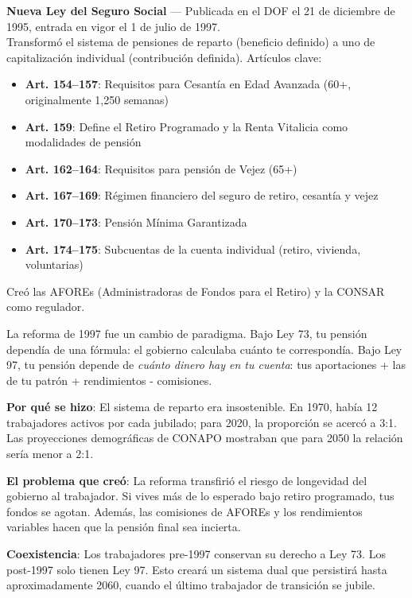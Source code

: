 \documentclass[11pt,a4paper]{report}
\begin{document}
\begin{tcolorbox}[colback=blue!5!white, colframe=blue!75!black, title=\textbf{Definici\'on Formal}]
\textbf{Nueva Ley del Seguro Social} --- Publicada en el DOF el 21 de diciembre de 1995, entrada en vigor el 1 de julio de 1997.\\[0.3em]
Transform\'o el sistema de pensiones de reparto (beneficio definido) a uno de capitalizaci\'on individual (contribuci\'on definida). Art\'iculos clave:
\begin{itemize}[nosep]
\item \textbf{Art. 154--157}: Requisitos para Cesant\'ia en Edad Avanzada (60+, originalmente 1,250 semanas)
\item \textbf{Art. 159}: Define el Retiro Programado y la Renta Vitalicia como modalidades de pensi\'on
\item \textbf{Art. 162--164}: Requisitos para pensi\'on de Vejez (65+)
\item \textbf{Art. 167--169}: R\'egimen financiero del seguro de retiro, cesant\'ia y vejez
\item \textbf{Art. 170--173}: Pensi\'on M\'inima Garantizada
\item \textbf{Art. 174--175}: Subcuentas de la cuenta individual (retiro, vivienda, voluntarias)
\end{itemize}
Cre\'o las AFOREs (Administradoras de Fondos para el Retiro) y la CONSAR como regulador.
\end{tcolorbox}

\begin{tcolorbox}[colback=green!5!white, colframe=green!50!black, title=\textbf{Intuici\'on}]
La reforma de 1997 fue un cambio de paradigma. Bajo Ley 73, tu pensi\'on depend\'ia de una f\'ormula: el gobierno calculaba cu\'anto te correspond\'ia. Bajo Ley 97, tu pensi\'on depende de \emph{cu\'anto dinero hay en tu cuenta}: tus aportaciones + las de tu patr\'on + rendimientos - comisiones.

\textbf{Por qu\'e se hizo}: El sistema de reparto era insostenible. En 1970, hab\'ia 12 trabajadores activos por cada jubilado; para 2020, la proporci\'on se acerc\'o a 3:1. Las proyecciones demogr\'aficas de CONAPO mostraban que para 2050 la relaci\'on ser\'ia menor a 2:1.

\textbf{El problema que cre\'o}: La reforma transfiri\'o el riesgo de longevidad del gobierno al trabajador. Si vives m\'as de lo esperado bajo retiro programado, tus fondos se agotan. Adem\'as, las comisiones de AFOREs y los rendimientos variables hacen que la pensi\'on final sea incierta.

\textbf{Coexistencia}: Los trabajadores pre-1997 conservan su derecho a Ley 73. Los post-1997 solo tienen Ley 97. Esto crear\'a un sistema dual que persistir\'a hasta aproximadamente 2060, cuando el \'ultimo trabajador de transici\'on se jubile.
\end{tcolorbox}
\end{document}
